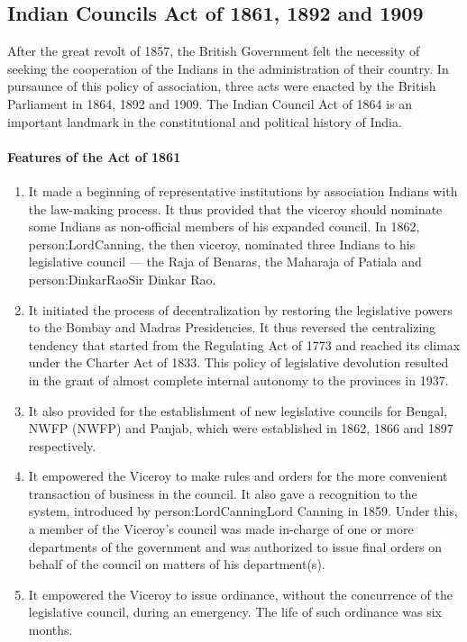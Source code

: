 \subsection{Indian Councils Act of 1861, 1892 and 1909}

After the great revolt of 1857, the British Government felt the necessity of seeking the cooperation of the Indians in the administration of their country. In pursaunce of this policy of association, three acts were enacted by the British Parliament in 1864, 1892 and 1909. The Indian Council Act of 1864 is an important landmark in the constitutional and political history of India.

\paragraph{Features of the Act of 1861}
\begin{enumerate}
  \item It made a beginning of representative institutions by association Indians with the law-making process. It thus provided that the viceroy should nominate some Indians as non-official members of his expanded council. In 1862, \gls{person:LordCanning}, the then viceroy, nominated three Indians to his legislative council — the Raja of Benaras, the Maharaja of Patiala and \gls{person:DinkarRao}Sir Dinkar Rao.
  \item It initiated the process of decentralization by restoring the legislative powers to the Bombay and Madras Presidencies. It thus reversed the centralizing tendency that started from the Regulating Act of 1773 and reached its climax under the Charter Act of 1833. This policy of legislative devolution resulted in the grant of almost complete internal autonomy to the provinces in 1937.
  \item It also provided for the establishment of new legislative councils for Bengal, \gls{NWFP} (NWFP) and Panjab, which were established in 1862, 1866 and 1897 respectively.
  \item It empowered the Viceroy to make rules and orders for the more convenient transaction of business in the council. It also gave a recognition to the   system, introduced by \gls{person:LordCanning}Lord Canning in 1859. Under this, a member of the Viceroy's council was made in-charge of one or more departments of the government and was authorized to issue final orders on behalf of the council on matters of his department(s).
  \item It empowered the Viceroy to issue ordinance, without the concurrence of the legislative council, during an emergency. The life of such ordinance was six months.
\end{enumerate}

